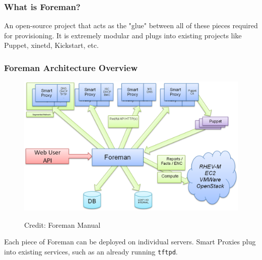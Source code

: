 \documentclass{beamer}
\begin{document}
\begin{frame}
	\frametitle{What is Foreman?}
	An open-source project that acts as the "glue" between all of these pieces required for provisioning.
	It is extremely modular and plugs into existing projects like Puppet, xinetd, Kickstart, etc.
\end{frame}

\begin{frame}
	\frametitle{Foreman Architecture Overview}
	\centering
	\begin{figure}[t]
		\includegraphics[width=\textwidth,height=\textheight-4cm,keepaspectratio]{foreman_architecture}

		\tiny Credit: Foreman Manual
	\end{figure}
	Each piece of Foreman can be deployed on individual servers. Smart Proxies plug into existing services, such as an already running \texttt{tftpd}.
\end{frame}
\end{document}

